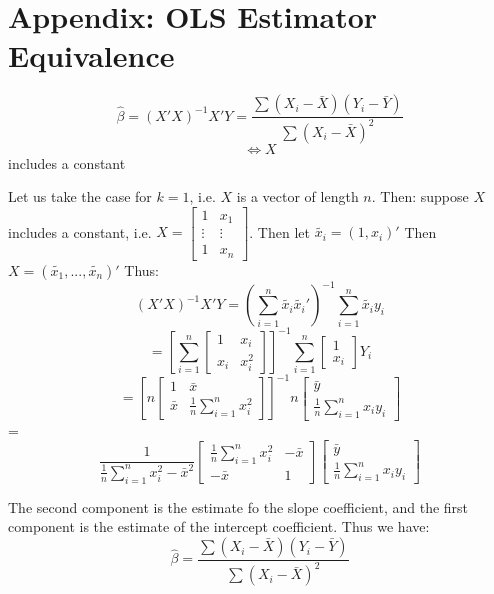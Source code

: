 \documentclass[DIV=14,titlepage=false]{scrreprt}
\begin{document}
\section{Appendix: OLS Estimator Equivalence}

\begin{claim}
  \[\hat{\beta}=(X'X)^{-1}X'Y=\frac{\sum(X_i-\bar{X})(Y_i-\bar{Y})}{\sum(X_i-\bar{X})^2}\]
  \[\iff X\] includes a constant
\end{claim}

Let us take the case for \(k=1\), i.e. \(X\) is a vector of length \(n\). Then: suppose \(X\) includes a constant, i.e. \(X=\begin{bmatrix}
  1 & x_1 \\ \vdots & \vdots \\ 1 & x_n \end{bmatrix}\). Then let \(\tilde{x_i}=(1,x_i)'\) Then \(X= (\tilde{x_1},...,\tilde{x_n})'\)
Thus:
  \[(X'X)^{-1}X'Y = (\sum_{i=1}^{n}\tilde{x_i}\tilde{x_i}')^{-1}\sum_{i=1}^{n}\tilde{x_i}y_i\]
  \[=\left[\sum_{i=1}^{n}\begin{bmatrix}
    1 & x_i \\ x_i & x_i^2 \end{bmatrix}\right]^{-1}\sum_{i=1}^{n} \begin{bmatrix}
        1 \\ x_i \end{bmatrix}Y_i\]
  \[=\left[ n\begin{bmatrix}
    1 & \bar{x} \\ \bar{x} & \frac{1}{n}\sum_{i=1}^{n}x_i^2 \end{bmatrix}\right]^{-1} n\begin{bmatrix}
      \bar{y} \\ \frac{1}{n}\sum_{i=1}^{n}x_iy_i  \end{bmatrix}\]
      =\[\frac{1}{\frac{1}{n}\sum_{i=1}^{n}x_i^2-\bar{x}^2}\begin{bmatrix}
        \frac{1}{n}\sum_{i=1}^{n}x_i^2 & -\bar{x} \\ -\bar{x} & 1 \end{bmatrix} \begin{bmatrix}
          \bar{y} \\ \frac{1}{n}\sum_{i=1}^{n}x_iy_i  \end{bmatrix}\]
  
The second component is the estimate fo the slope coefficient, and the first component is the estimate of the intercept coefficient. Thus we have:
\[\hat{\beta}=\frac{\sum(X_i-\bar{X})(Y_i-\bar{Y})}{\sum(X_i-\bar{X})^2}\]
\end{document}
